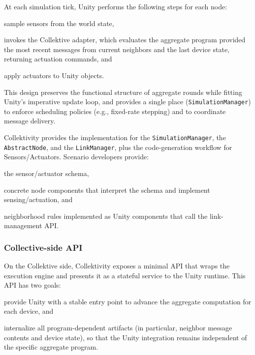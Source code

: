 At each simulation tick, Unity performs the following steps for each node:
\begin{inlinelist}
    \item sample sensors from the world state,
    \item invokes the Collektive adapter,
    which evaluates the aggregate program provided the most recent messages from current neighbors and the last device state,
    returning actuation commands,
    and
    \item apply actuators to Unity objects.
\end{inlinelist}
%
This design preserves the functional structure of aggregate rounds while fitting Unity's imperative update loop, and provides a single place
(\texttt{SimulationManager}) to enforce scheduling policies (e.g., fixed-rate stepping) and to coordinate message delivery.

Collektivity provides the implementation for the \texttt{SimulationManager}, the \texttt{AbstractNode}, and the \texttt{LinkManager},
plus the code-generation workflow for Sensors/Actuators.
%
Scenario developers provide:
\begin{inlinelist}
    \item the sensor/actuator schema,
    \item concrete node components that interpret the schema and implement sensing/actuation, and
    \item neighborhood rules implemented as Unity components that call the link-management \ac{API}.
\end{inlinelist}

\subsubsection{Collective-side \ac{API}}\label{subsec:collective-api}

On the Collektive side, Collektivity exposes a minimal \ac{API} that wraps the execution engine and
presents it as a stateful service to the Unity runtime.
This \ac{API} has two goals:
\begin{inlinelist}
    \item provide Unity with a stable entry point to advance the aggregate computation for each device, and
    \item internalize all program-dependent artifacts (in particular, neighbor message contents and device state),
    so that the Unity integration remains independent of the specific aggregate program.
\end{inlinelist}

